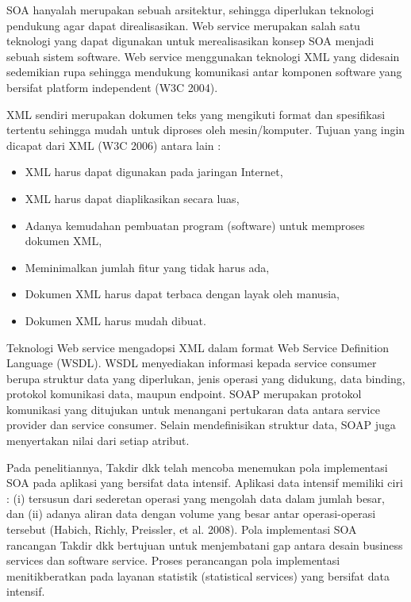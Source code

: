 SOA hanyalah merupakan sebuah arsitektur, sehingga diperlukan teknologi pendukung agar dapat direalisasikan. Web service merupakan salah satu teknologi yang dapat digunakan untuk merealisasikan konsep SOA menjadi sebuah sistem software. Web service menggunakan teknologi XML yang didesain sedemikian rupa sehingga mendukung komunikasi antar komponen software yang bersifat platform independent (W3C 2004).

XML sendiri merupakan dokumen teks yang mengikuti format dan spesifikasi tertentu sehingga mudah untuk diproses oleh mesin/komputer. Tujuan yang ingin dicapat dari XML (W3C 2006) antara lain :
\begin{itemize}
\item XML harus dapat digunakan pada jaringan Internet,
\item XML harus dapat diaplikasikan secara luas,
\item Adanya kemudahan pembuatan program (software) untuk memproses dokumen XML,
\item Meminimalkan jumlah fitur yang tidak harus ada,
\item Dokumen XML harus dapat terbaca dengan layak oleh manusia,
\item Dokumen XML harus mudah dibuat.
\end{itemize}

Teknologi Web service mengadopsi XML dalam format Web Service Definition Language (WSDL). WSDL menyediakan informasi kepada service consumer berupa struktur data yang diperlukan, jenis operasi yang didukung, data binding, protokol komunikasi data, maupun endpoint. SOAP merupakan protokol komunikasi yang ditujukan untuk menangani pertukaran data antara service provider dan service consumer. Selain mendefinisikan struktur data, SOAP juga menyertakan nilai dari setiap atribut.

Pada penelitiannya, Takdir dkk telah mencoba menemukan pola implementasi SOA pada aplikasi yang bersifat data intensif. Aplikasi data intensif memiliki ciri : (i) tersusun dari sederetan operasi yang mengolah data dalam jumlah besar, dan (ii) adanya aliran data dengan volume yang besar antar operasi-operasi tersebut (Habich, Richly, Preissler, et al. 2008). Pola implementasi SOA rancangan Takdir dkk bertujuan untuk menjembatani gap antara desain business services dan software service. Proses perancangan pola implementasi menitikberatkan pada layanan statistik (statistical services) yang bersifat data intensif.

